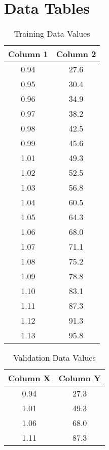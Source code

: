 \documentclass{article}
\begin{document}
\section*{Data Tables}

\begin{table}[h!]
    \centering
    \caption{Training Data Values}
    \label{tab:training_data}
    \begin{tabular}{|c|c|}
        \hline
        \textbf{Column 1} & \textbf{Column 2} \\
        \hline
        0.94 & 27.6 \\
        0.95 & 30.4 \\
        0.96 & 34.9 \\
        0.97 & 38.2 \\
        0.98 & 42.5 \\
        0.99 & 45.6 \\
        1.01 & 49.3 \\
        1.02 & 52.5 \\
        1.03 & 56.8 \\
        1.04 & 60.5 \\
        1.05 & 64.3 \\
        1.06 & 68.0 \\
        1.07 & 71.1 \\
        1.08 & 75.2 \\
        1.09 & 78.8 \\
        1.10 & 83.1 \\
        1.11 & 87.3 \\
        1.12 & 91.3 \\
        1.13 & 95.8 \\
        \hline
    \end{tabular}
\end{table}

\vspace{1em} %

\begin{table}[h!]
    \centering
    \caption{Validation Data Values}
    \label{tab:validation_data}
    \begin{tabular}{|c|c|}
        \hline
        \textbf{Column X} & \textbf{Column Y} \\
        \hline
        0.94 & 27.3 \\
        1.01 & 49.3 \\
        1.06 & 68.0 \\
        1.11 & 87.3 \\
        \hline
    \end{tabular}
\end{table}
\end{document}
